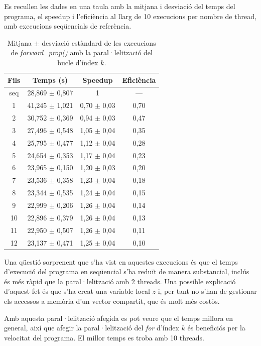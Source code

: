 \documentclass{article}
\begin{document}
Es recullen les dades en una taula amb la mitjana i desviació del temps del programa, el speedup i l'eficiència al llarg de 10 execucions per nombre de thread, amb execucions seqüencials de referència.

\begin{table}[H]
\centering
\begin{tabular}{|c|c|c|c|}
\hline
\textbf{Fils} & \textbf{Temps (s)} & \textbf{Speedup} & \textbf{Eficiència} \\ \hline
seq & 28,869 $\pm$ 0,807 & 1 & --- \\ \hline
1 & 41,245 $\pm$ 1,021 & 0,70 $\pm$ 0,03 & 0,70 \\ \hline
2 & 30,752 $\pm$ 0,369 & 0,94 $\pm$ 0,03 & 0,47 \\ \hline
3 & 27,496 $\pm$ 0,548 & 1,05 $\pm$ 0,04 & 0,35 \\ \hline
4 & 25,795 $\pm$ 0,477 & 1,12 $\pm$ 0,04 & 0,28 \\ \hline
5 & 24,654 $\pm$ 0,353 & 1,17 $\pm$ 0,04 & 0,23 \\ \hline
6 & 23,965 $\pm$ 0,150 & 1,20 $\pm$ 0,03 & 0,20 \\ \hline
7 & 23,536 $\pm$ 0,358 & 1,23 $\pm$ 0,04 & 0,18 \\ \hline
8 & 23,344 $\pm$ 0,535 & 1,24 $\pm$ 0,04 & 0,15 \\ \hline
9 & 22,999 $\pm$ 0,206 & 1,26 $\pm$ 0,04 & 0,14 \\ \hline
10 & 22,896 $\pm$ 0,379 & 1,26 $\pm$ 0,04 & 0,13 \\ \hline
11 & 22,950 $\pm$ 0,507 & 1,26 $\pm$ 0,04 & 0,11 \\ \hline
12 & 23,137 $\pm$ 0,471 & 1,25 $\pm$ 0,04 & 0,10 \\ \hline
\end{tabular}
\caption{Mitjana $\pm$ desviació estàndard de les execucions de \textit{forward\_prop()} amb la paral·lelització del bucle d'índex $k$.}
\label{tab:resultats1}
\end{table}

Una qüestió sorprenent que s'ha vist en aquestes execucions és que el temps d'execució del programa en seqüencial s'ha reduït de manera substancial, inclús és més ràpid que la paral·lelització amb 2 threads. Una possible explicació d'aquest fet és que s'ha creat una variable local $z$ i, per tant no s'han de gestionar els accessos a memòria d'un vector compartit, que és molt més costòs.

Amb aquesta paral·lelització afegida es pot veure que el temps millora en general, així que afegir la paral·lelització del \textit{for} d'índex $k$ és beneficiós per la velocitat del programa. El millor temps es troba amb 10 threads.
\end{document}
